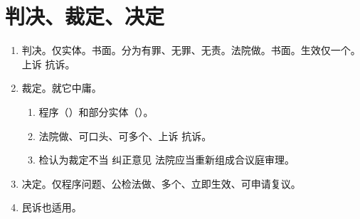 \section{判决、裁定、决定}
\begin{enumerate}
  \item 判决。仅实体。书面。分为有罪、无罪、无责。法院做。书面。生效仅一个。上诉 \hz 抗诉。
  \item 裁定。就它中庸。
        \begin{enumerate}
          \item 程序（）和部分实体（）。
          \item 法院做、可口头、可多个、上诉 \hz 抗诉。
          \item 检认为裁定不当 \yjt 纠正意见 \yjt 法院应当重新组成合议庭审理。
        \end{enumerate}
  \item 决定。仅程序问题、公检法做、多个、立即生效、可申请复议。
  \item 民诉也适用。
\end{enumerate}
